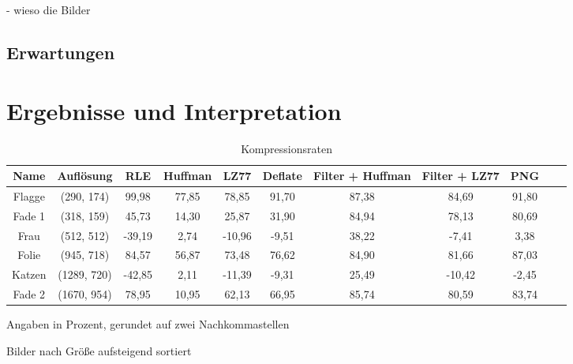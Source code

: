 \documentclass[conference]{IEEEtran}
\begin{document}
- wieso die Bilder


\subsection{Erwartungen}



\section{Ergebnisse und Interpretation}

\begin{table}
  \renewcommand*{\arraystretch}{1.1}
  \centering
  \begin{threeparttable}
    \caption{Kompressionsraten}
    \label{tab:komprate}
      \begin{tabular}{c *9{c} S[table-format=5.9]}

      \toprule
      Name    &  Auflösung  & RLE   & Huffman   & LZ77  & Deflate   & Filter + Huffman  & Filter + LZ77     & PNG   \\
      \midrule
      Flagge  & (290, 174)  & 99,98  & 77,85     & 78,85  & 91,70     & 87,38             & 84,69             & 91,80  \\
      Fade 1  & (318, 159)  & 45,73  & 14,30     & 25,87  & 31,90     & 84,94             & 78,13             & 80,69  \\
      Frau    & (512, 512)  & -39,19 & 2,74      & -10,96 & -9,51     & 38,22             & -7,41             & 3,38   \\
      Folie   & (945, 718)  & 84,57  & 56,87     & 73,48  & 76,62     & 84,90             & 81,66             & 87,03  \\
      Katzen  & (1289, 720) & -42,85 & 2,11      & -11,39 & -9,31     & 25,49             & -10,42            & -2,45  \\ 
      Fade 2  & (1670, 954) & 78,95  & 10,95     & 62,13  & 66,95     & 85,74             & 80,59             & 83,74          
    \end{tabular}
    \par{} Angaben in Prozent, gerundet auf zwei Nachkommastellen
    \par{} Bilder nach Größe aufsteigend sortiert
  \end{threeparttable}
\end{table}
\end{document}
